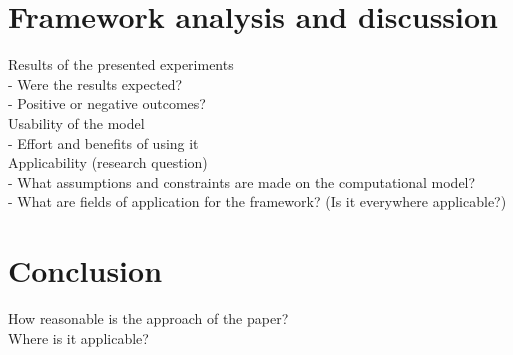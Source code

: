 \documentclass[12pt,twoside]{article}
\theoremstyle{plain}
\theoremstyle{definition}
\theoremstyle{remark}
\begin{document}
\section{Framework analysis and discussion}
\label{sec:analysis}

Results of the presented experiments\\
- Were the results expected?\\
- Positive or negative outcomes?\\
Usability of the model\\
- Effort and benefits of using it\\
Applicability (research question)\\
- What assumptions and constraints are made on the computational model?\\
- What are fields of application for the framework? (Is it everywhere applicable?)\\

\section{Conclusion}
\label{sec:concl}

How reasonable is the approach of the paper?\\
Where is it applicable?

%
%
\newpage


\end{document}
